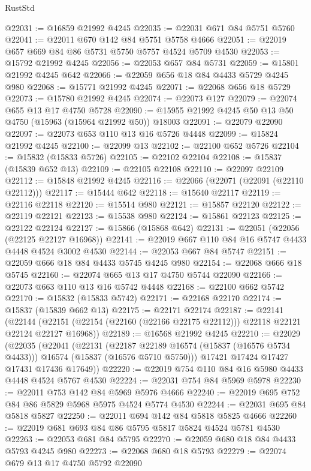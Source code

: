 \begin{lexlean}{RustStd}
\begin{coremodule}
@22031 := @16859 @21992 @4245
@22035 := @22031 @671 @84 @5751 @5760
@22041 := @22011 @670 @142 @84 @5751 @5758 @4666
@22051 := @22019 @657 @669 @84 @86 @5731 @5750 @5757 @4524 @5709 @4530
@22053 := @15792 @21992 @4245
@22056 := @22053 @657 @84 @5731
@22059 := @15801 @21992 @4245 @642
@22066 := @22059 @656 @18 @84 @4433 @5729 @4245 @980
@22068 := @15771 @21992 @4245
@22071 := @22068 @656 @18 @5729
@22073 := @15780 @21992 @4245
@22074 := @22073 @127
@22079 := @22074 @655 @13 @17 @4750 @5728
@22090 := @15955 @21992 @4245 @50 @13 @50 @4750 (@15963 (@15964 @21992 @50)) @18003
@22091 := @22079 @22090
@22097 := @22073 @653 @110 @13 @16 @5726 @4448
@22099 := @15824 @21992 @4245
@22100 := @22099 @13
@22102 := @22100 @652 @5726
@22104 := @15832 (@15833 @5726)
@22105 := @22102 @22104
@22108 := @15837 (@15839 @652 @13)
@22109 := @22105 @22108
@22110 := @22097 @22109
@22112 := @15848 @21992 @4245
@22116 := @22066 (@22071 (@22091 (@22110 @22112)))
@22117 := @15444 @642
@22118 := @15640 @22117
@22119 := @22116 @22118
@22120 := @15514 @980
@22121 := @15857 @22120
@22122 := @22119 @22121
@22123 := @15538 @980
@22124 := @15861 @22123
@22125 := @22122 @22124
@22127 := @15866 (@15868 @642)
@22131 := @22051 (@22056 (@22125 @22127 @16968))
@22141 := @22019 @667 @110 @84 @16 @5747 @4433 @4448 @4524 @3002 @4530
@22144 := @22053 @667 @84 @5747
@22151 := @22059 @666 @18 @84 @4433 @5745 @4245 @980
@22154 := @22068 @666 @18 @5745
@22160 := @22074 @665 @13 @17 @4750 @5744 @22090
@22166 := @22073 @663 @110 @13 @16 @5742 @4448
@22168 := @22100 @662 @5742
@22170 := @15832 (@15833 @5742)
@22171 := @22168 @22170
@22174 := @15837 (@15839 @662 @13)
@22175 := @22171 @22174
@22187 := @22141
    (@22144 (@22151 (@22154 (@22160 (@22166 @22175 @22112))) @22118 @22121 @22124 @22127 @16968))
@22189 := @16568 @21992 @4245
@22210 := @22029
    (@22035
      (@22041
        (@22131
          (@22187 @22189 @16574 (@15837 (@16576 @5734 @4433)))
          @16574
          (@15837 (@16576 @5710 @5750)))
        @17421
        @17424
        @17427
        @17431
        @17436
        @17649))
@22220 := @22019 @754 @110 @84 @16 @5980 @4433 @4448 @4524 @5767 @4530
@22224 := @22031 @754 @84 @5969 @5978
@22230 := @22011 @753 @142 @84 @5969 @5976 @4666
@22240 := @22019 @695 @752 @84 @86 @5829 @5968 @5975 @4524 @5774 @4530
@22244 := @22031 @695 @84 @5818 @5827
@22250 := @22011 @694 @142 @84 @5818 @5825 @4666
@22260 := @22019 @681 @693 @84 @86 @5795 @5817 @5824 @4524 @5781 @4530
@22263 := @22053 @681 @84 @5795
@22270 := @22059 @680 @18 @84 @4433 @5793 @4245 @980
@22273 := @22068 @680 @18 @5793
@22279 := @22074 @679 @13 @17 @4750 @5792 @22090

\end{coremodule}
\end{lexlean}
